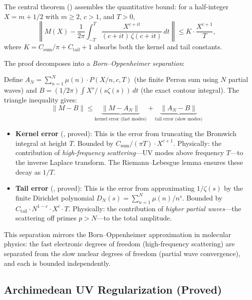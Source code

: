 The central theorem 
() assembles the quantitative bound:
for a half-integer $X = m + 1/2$ with $m \geq 2$, $c > 1$, and $T > 0$,
\[
  \left\| M(X) - \frac{1}{2\pi} \int_{-T}^{T}
  \frac{X^{c+it}}{(c+it)\,\zeta(c+it)}\,dt \right\|
  \leq K \cdot \frac{X^{c+1}}{T},
\]
where $K = C_{\mathrm{sum}}/\pi + C_{\mathrm{tail}} + 1$ absorbs
both the kernel and tail constants.

The proof decomposes into a \emph{Born--Oppenheimer separation}:

\begin{correspondence}
\label{corr:born-oppenheimer}
Define $A_N = \sum_{n=1}^{N} \mu(n) \cdot P(X/n, c, T)$ (the finite
Perron sum using $N$ partial waves) and $B = (1/2\pi)\int X^s/(s\zeta(s))\,dt$
(the exact contour integral). The triangle inequality gives:
\[
  \|M - B\| \leq \underbrace{\|M - A_N\|}_{\text{kernel error (fast modes)}}
  + \underbrace{\|A_N - B\|}_{\text{tail error (slow modes)}}
\]
\begin{itemize}
  \item \textbf{Kernel error} (,
    proved): This is the error from truncating the Bromwich integral at
    height $T$. Bounded by $C_{\mathrm{sum}}/(\pi T) \cdot X^{c+1}$.
    Physically: the contribution of \emph{high-frequency scattering}---UV
    modes above frequency $T$---to the inverse Laplace transform. The
    Riemann--Lebesgue lemma ensures these decay as $1/T$.

  \item \textbf{Tail error} (,
    proved): This is the error from approximating $1/\zeta(s)$ by
    the finite Dirichlet polynomial $D_N(s) = \sum_{n=1}^{N} \mu(n)/n^s$.
    Bounded by $C_{\mathrm{tail}} \cdot N^{1-c} \cdot X^c \cdot T$.
    Physically: the contribution of \emph{higher partial waves}---the
    scattering off primes $p > N$---to the total amplitude.
\end{itemize}
This separation mirrors the Born--Oppenheimer approximation in molecular
physics: the fast electronic degrees of freedom (high-frequency scattering)
are separated from the slow nuclear degrees of freedom (partial wave convergence),
and each is bounded independently.
\end{correspondence}

\subsection{Archimedean UV Regularization (Proved)}

